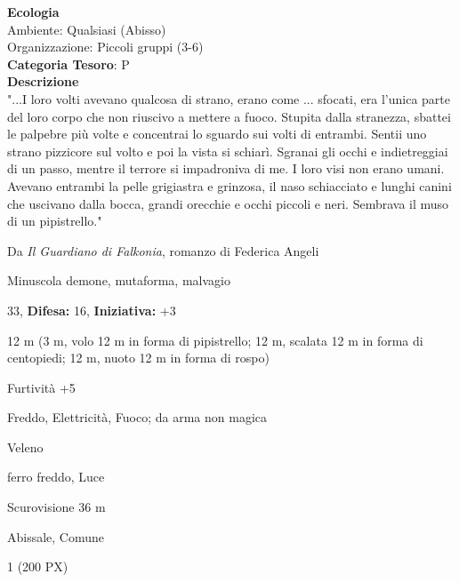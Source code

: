 \begin{multicols}{2}
{\textbf{Ecologia}\\
Ambiente: Qualsiasi (Abisso)\\
Organizzazione: Piccoli gruppi (3-6)\\
\textbf{Categoria Tesoro}: P\\
\textbf{Descrizione}\\
"...I loro volti avevano qualcosa di strano, erano come ... sfocati, era l'unica parte del loro corpo che non riuscivo a mettere a fuoco. Stupita dalla stranezza, sbattei le palpebre più volte e concentrai lo sguardo sui volti di entrambi. Sentii uno strano pizzicore sul volto e poi la vista si schiarì.
Sgranai gli occhi e indietreggiai di un passo, mentre il terrore si impadroniva di me. I loro visi non erano umani. Avevano entrambi la pelle grigiastra e grinzosa, il naso schiacciato e lunghi canini che uscivano dalla bocca, grandi orecchie e occhi piccoli e neri. Sembrava il muso di un pipistrello."

Da \emph{Il Guardiano di Falkonia}, romanzo di Federica Angeli

\noindent
\begin{description}[noitemsep, topsep=0pt, parsep=0pt, partopsep=0pt, leftmargin=0cm, labelwidth=2.2cm]
	\item[\textbf{Taglia/Tipo:}] Minuscola demone, mutaforma, malvagio
	\item[\textbf{Caratt.:}] 
	\item[\textbf{Punti Ferita:}] 33,  \textbf{Difesa:} 16,  \textbf{Iniziativa:} +3
	\item[\textbf{Movimento:}] 12 m (3 m, volo 12 m in forma di pipistrello; 12 m, scalata 12 m in forma di centopiedi; 12 m, nuoto 12 m in forma di rospo)
	\item[\textbf{Tiri Salvez.:}] 
	\item[\textbf{Comp.:}] Furtività +5
	\item[\textbf{Res. Danni:}] Freddo, Elettricità, Fuoco; da arma non magica
	\item[\textbf{Imm. Danni:}] Veleno
	\item[\textbf{Vulnerabilità:}] ferro freddo, Luce
	\item[\textbf{Sensi:}] Scurovisione 36 m
	\item[\textbf{Linguaggi:}] Abissale, Comune
	\item[\textbf{Sfida:}] 1 (200 PX)\smallskip
\end{description}

}
\end{multicols}
